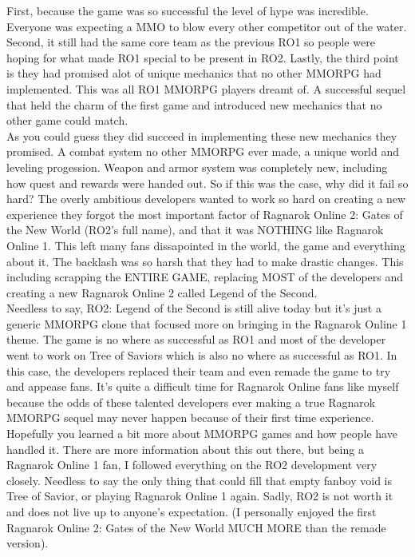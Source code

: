 \documentclass{42-en}
\begin{document}
	First, because the game was so successful the level of hype was incredible. Everyone 
	was expecting a MMO to blow every other competitor out of the water. Second, it still
	had the same core team as the previous RO1 so people were hoping for what made
	RO1 special to be present in RO2. Lastly, the third point is they had promised
	alot of unique mechanics that no other MMORPG had implemented. This was all RO1
	MMORPG players dreamt of. A successful sequel that held the charm of the first game
	and introduced new mechanics that no other game could match.\\

	As you could guess they did succeed in implementing these new mechanics they promised. 
	A combat system no other MMORPG ever made, a unique world and leveling progession.
	Weapon and armor system was completely new, including how quest and rewards were
	handed out. So if this was the case, why did it fail so hard? The overly ambitious
	developers wanted to work so hard on creating a new experience they forgot the most important
	factor of Ragnarok Online 2: Gates of the New World (RO2's full name), and that
	it was NOTHING like Ragnarok Online 1. This left many fans dissapointed in the world,
	the game and everything about it. The backlash was so harsh that they had to make drastic changes.
	This including scrapping the ENTIRE GAME, replacing MOST of the developers and creating
	a new Ragnarok Online 2 called Legend of the Second.\\

	Needless to say, RO2: Legend of the Second is still alive today but it's just a generic
	MMORPG clone that focused more on bringing in the Ragnarok Online 1 theme. The game
	is no where as successful as RO1 and most of the developer went to work on Tree of Saviors
	which is also no where as successful as RO1. In this case, the developers replaced their
	team and even remade the game to try and appease fans. It's quite a difficult 
	time for Ragnarok Online fans like myself because the odds of these talented developers
	ever making a true Ragnarok MMORPG sequel may never happen because of their first time experience.\\

	Hopefully you learned a bit more about MMORPG games and how people have handled it.
	There are more information about this out there, but being a Ragnarok Online 1 fan, I followed
	everything on the RO2 development very closely. Needless to say the only thing that
	could fill that empty fanboy void is Tree of Savior, or playing Ragnarok Online 1 again.
	Sadly, RO2 is not worth it and does not live up to anyone's expectation. (I personally enjoyed
	the first Ragnarok Online 2: Gates of the New World MUCH MORE than the remade version).\\
\end{document}
